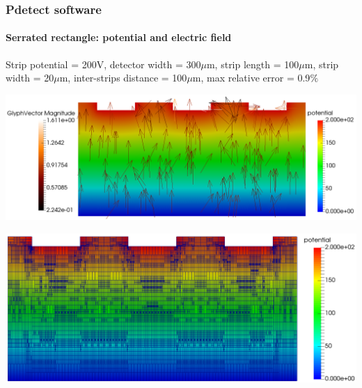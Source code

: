 \documentclass[14pt]{beamer}
\begin{document}
\begin{frame}
  \frametitle{Pdetect software}
  \framesubtitle{Serrated rectangle: potential and electric field}

  \fontsize{10pt}{7.2}\selectfont


  Strip potential = 200V, detector width = 300$\mu$m, strip length = 100$\mu$m, strip width = 20$\mu$m,
  inter-strips distance = 100$\mu$m, max relative error = 0.9$\%$

  \vspace{-2em}

  \begin{center}
  \includegraphics[scale=0.18]{images/serrated_pot_3.png}
  \end{center}

\vspace{-2em}

  \begin{center}
  \hspace{4.5em} \includegraphics[scale=0.15]{images/serrated_pot_3_grid.png}
  \end{center}

\end{frame}
\end{document}
